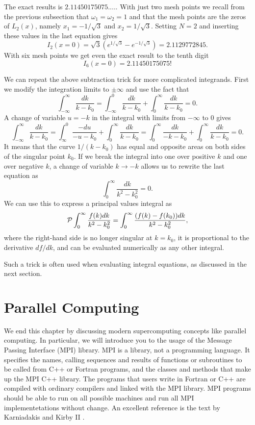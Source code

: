 The exact results is $2.11450175075....$. With just two mesh points we recall
from the previous subsection that $\omega_1=\omega_2=1$ and that the mesh points are the zeros of $L_2(x)$, namely $x_1=-1/\sqrt{3}$ and 
$x_2=1/\sqrt{3}$. Setting $N=2$ and inserting these values in the last
equation gives
\[
   I_2(x=0)=\sqrt{3}\left(e^{1/\sqrt{3}}-e^{-1/\sqrt{3}}\right)=2.1129772845.
\]
With six mesh points we get even the exact result to the tenth digit
\[
   I_6(x=0)=2.11450175075!
\]

We can repeat the above subtraction trick  for more complicated
integrands.
First we modify the integration limits to $\pm \infty$ and use the fact
that 
\[
  \int_{-\infty}^{\infty} \frac{dk}{k-k_0}=
  \int_{-\infty}^{0} \frac{dk}{k-k_0}+
  \int_{0}^{\infty} \frac{dk}{k-k_0} =0.
\]
A change of variable $u=-k$ in the integral with limits from $-\infty$ to $0$ gives
\[
  \int_{-\infty}^{\infty} \frac{dk}{k-k_0}=
  \int_{\infty}^{0} \frac{-du}{-u-k_0}+
  \int_{0}^{\infty} \frac{dk}{k-k_0}=  \int_{0}^{\infty} \frac{dk}{-k-k_0}+
  \int_{0}^{\infty} \frac{dk}{k-k_0}=0.
\]
It means that the curve $1/(k-k_0)$ has equal and opposite
areas on both sides of the singular point $k_0$. If we break
the integral into one over positive $k$ and one over 
negative $k$, a change of variable $k\rightarrow -k$ 
allows us to rewrite the last equation as
\[
  \int_{0}^{\infty} \frac{dk}{k^2-k_0^2} =0.
\]
We can use this to express a principal values integral
as
\begin{equation}
  {\cal P}\int_{0}^{\infty} \frac{f(k)dk}{k^2-k_0^2} =
  \int_{0}^{\infty} \frac{(f(k)-f(k_0))dk}{k^2-k_0^2},
   \label{eq:trick_pintegral}
\end{equation}
where the right-hand side is no longer singular at 
$k=k_0$, it is proportional to the derivative $df/dk$,
and can be evaluated numerically as any other integral.

Such a trick is often used when evaluating integral  equations, as discussed in the next section.



\section{Parallel Computing}

We end this chapter by discussing modern supercomputing concepts like parallel computing.
In particular, we will introduce you to the usage of the Message Passing Interface (MPI) library.
MPI is a library, not a programming language. It specifies the names, calling sequences and results of functions
or subroutines to be called from C++ or Fortran programs, and the classes and methods that make up the MPI C++
library. The programs that users write in Fortran or C++ are compiled with ordinary compilers and linked
with the MPI library. MPI programs should be able to run
on all possible machines and run all MPI implementetations without change.
An excellent reference is the text by Karniadakis and Kirby II \cite{cmpi}.


